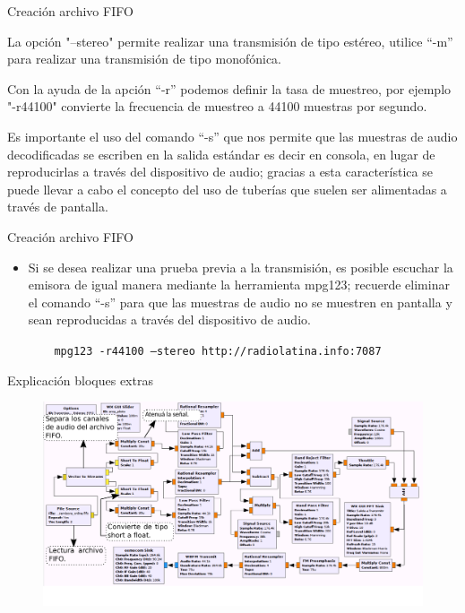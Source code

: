 \begin{frame}{Creación archivo FIFO}

La opción "--stereo" permite realizar una transmisión de tipo estéreo, utilice “-m” para realizar una transmisión de tipo monofónica.\vspace{2mm}

Con la ayuda de la apción “-r” podemos definir la tasa de muestreo, por ejemplo "-r44100" convierte la frecuencia de muestreo a 44100 muestras por segundo. \vspace{2mm}

Es importante el uso del comando “-s” que nos permite que las muestras de audio decodificadas se escriben en la salida estándar es decir en consola, en lugar de reproducirlas a través del dispositivo de audio; gracias a esta característica se puede llevar a cabo el concepto del uso de tuberías que suelen ser alimentadas a través de pantalla.

\end{frame}

\begin{frame}{Creación archivo FIFO}

\begin{itemize}
    \item {Si se desea realizar una prueba previa a la transmisión, es posible escuchar la emisora de igual manera mediante la herramienta mpg123; recuerde eliminar el comando “-s” para que las muestras de audio no se muestren en pantalla y sean reproducidas a través del dispositivo de audio.
    
    \begin{block}{}
    \texttt{
    \ \ \ mpg123 -r44100 --stereo  http://radiolatina.info:7087}
    \end{block}
    }
\end{itemize}
\end{frame}

\begin{frame}{Explicación bloques extras}

\begin{figure}[H]
\centering
\vspace{-3mm}
\includegraphics[width=\textwidth]{parte3/lab13/pdf/lab13_3.pdf}
\end{figure}
\end{frame}

